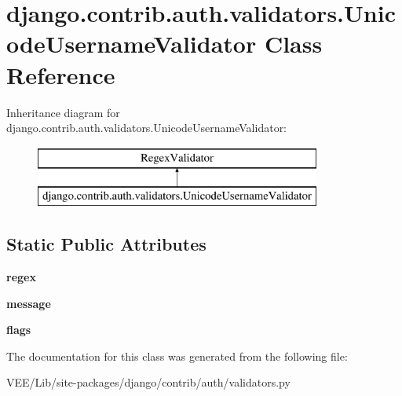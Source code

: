 \hypertarget{classdjango_1_1contrib_1_1auth_1_1validators_1_1_unicode_username_validator}{}\section{django.\+contrib.\+auth.\+validators.\+Unicode\+Username\+Validator Class Reference}
\label{classdjango_1_1contrib_1_1auth_1_1validators_1_1_unicode_username_validator}
Inheritance diagram for django.\+contrib.\+auth.\+validators.\+Unicode\+Username\+Validator\+:\begin{figure}[H]
\begin{center}
\leavevmode
\includegraphics[height=2.000000cm]{classdjango_1_1contrib_1_1auth_1_1validators_1_1_unicode_username_validator}
\end{center}
\end{figure}
\subsection*{Static Public Attributes}
\begin{DoxyCompactItemize}
\item 
\mbox{\label{classdjango_1_1contrib_1_1auth_1_1validators_1_1_unicode_username_validator_a3013515fbd64a62b7319800bb592dd80}} 
{\bfseries regex}
\item 
\mbox{\label{classdjango_1_1contrib_1_1auth_1_1validators_1_1_unicode_username_validator_ad45a9cc6ddceeaf27b0586e6476c8064}} 
{\bfseries message}
\item 
\mbox{\label{classdjango_1_1contrib_1_1auth_1_1validators_1_1_unicode_username_validator_a7705d9763a7e1f9f0f08f0d61cf49a24}} 
{\bfseries flags}
\end{DoxyCompactItemize}


The documentation for this class was generated from the following file\+:\begin{DoxyCompactItemize}
\item 
V\+E\+E/\+Lib/site-\/packages/django/contrib/auth/validators.\+py\end{DoxyCompactItemize}
